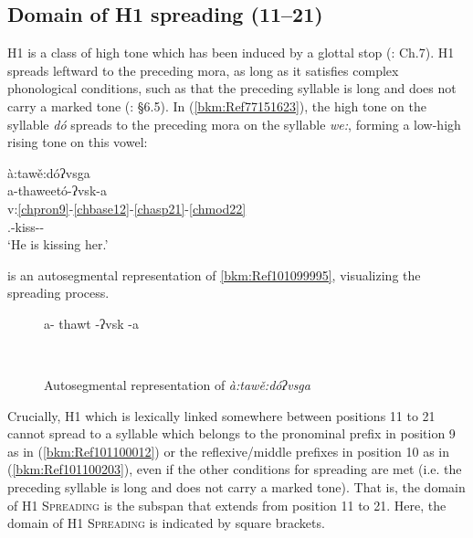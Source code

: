 \documentclass[output=paper]{langscibook}
\begin{document}
\subsection{Domain of H1 spreading (11--21)}
\label{bkm:Ref87347547}
H1 is a class of high tone which has been induced by a glottal stop (\citealt{Uchihara2009, uchihara2016tone}: Ch.7). H1 spreads leftward to the preceding mora, as long as it satisfies complex phonological conditions, such as that the preceding syllable is long and does not carry a marked tone (\citealt{uchihara2016tone}: \S 6.5). In (\ref{bkm:Ref77151623}), the high tone on the syllable \textit{dó} spreads to the preceding mora on the syllable \textit{we:}, forming a low-high rising tone on this vowel:

\ea\label{bkm:Ref101099995}\label{bkm:Ref77151623} {à:tawě:dóʔvsga} \\
\glll a-thaweetó-ʔvsk-a\\
v:\ref{chpron9}-\ref{chbase12}-\ref{chasp21}-\ref{chmod22}\\
\Third\Sg.\Aarg{}-kiss-\Prs{}-\Ind{}\\  
\glt `He is kissing her.' \citep[58]{Feeling1975}
\z 

 is an autosegmental representation of \ref{bkm:Ref101099995}, visualizing the spreading process.
\begin{figure}
    \centering
    \caption{Autosegmental representation of \textit{à:tawě:dóʔvsga}}
    \label{fig:bkm:Ref101099995}
    a- thawt -ʔvsk -a\\\bigskip

    ~~~~~
\end{figure}

Crucially, H1 which is lexically linked somewhere between positions 11 to 21 cannot spread to a syllable which belongs to the pronominal prefix in position 9 as in (\ref{bkm:Ref101100012}) or the reflexive/middle prefixes in position 10 as in (\ref{bkm:Ref101100203}), even if the other conditions for spreading are met (i.e. the preceding syllable is long and does not carry a marked tone). That is, the domain of H1 \textsc{Spreading} is the subspan that extends from position 11 to 21. Here, the domain of H1 \textsc{Spreading} is indicated by square brackets.
\end{document}
